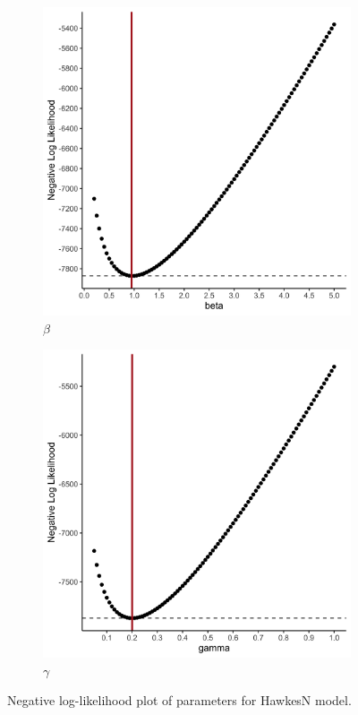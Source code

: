 \documentclass[12pt]{article}
\begin{document}
\begin{figure}
\centering
\begin{subfigure}{.5\textwidth}
  \centering
  \includegraphics[width=0.9\linewidth]{../figures/SIR_neg-log-likelihood-plot_beta.png}
  \caption{$\beta$}
\end{subfigure}%
\begin{subfigure}{.5\textwidth}
  \centering
  \includegraphics[width=0.9\linewidth]{../figures/SIR_neg-log-likelihood-plot_gamma.png}
  \caption{$\gamma$}
\end{subfigure}
\caption{Negative log-likelihood plot of parameters for HawkesN model. }
\label{fig:SIR-ll}
\end{figure}
\end{document}
